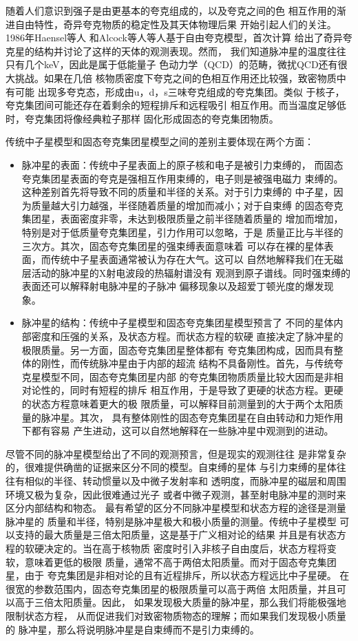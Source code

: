 随着人们意识到强子是由更基本的夸克组成的，以及夸克之间的色
相互作用的渐进自由特性，奇异夸克物质的稳定性及其天体物理后果
开始引起人们的关注\supercite{wit84}。1986年Haensel等人\supercite{hzs86}
和Alcock等人\supercite{afo86}等人基于自由夸克模型，首次计算
给出了奇异夸克星的结构并讨论了这样的天体的观测表现。然而，
我们知道脉冲星的温度往往只有几个keV，因此是属于低能量子
色动力学（QCD）的范畴，微扰QCD还有很大挑战。如果在几倍
核物质密度下夸克之间的色相互作用还比较强，致密物质中有可能
出现多夸克态，形成由u，d，s三味夸克组成的夸克集团。类似
于核子，夸克集团间可能还存在着剩余的短程排斥和远程吸引
相互作用。而当温度足够低时，夸克集团将像经典粒子那样
固化形成固态的夸克集团物质。

传统中子星模型和固态夸克集团星模型之间的差别主要体现在两个方面：
\begin{itemize}
\item 脉冲星的表面：传统中子星表面上的原子核和电子是被引力束缚的，
而固态夸克集团星表面的夸克是强相互作用束缚的，电子则是被强电磁力
束缚的。这种差别首先将导致不同的质量和半径的关系。对于引力束缚的
中子星，因为质量越大引力越强，半径随着质量的增加而减小；对于自束缚
的固态夸克集团星，表面密度非零，未达到极限质量之前半径随着质量的
增加而增加，特别是对于低质量夸克集团星，引力作用可以忽略，于是
质量正比与半径的三次方。其次，固态夸克集团星的强束缚表面意味着
可以存在裸的星体表面，而传统中子星表面通常被认为存在大气。这可以
自然地解释我们在无磁层活动的脉冲星的X射电波段的热辐射谱没有
观测到原子谱线。同时强束缚的表面还可以解释射电脉冲星的子脉冲
偏移现象以及超爱丁顿光度的爆发现象。
\item 脉冲星的结构：传统中子星模型和固态夸克集团星模型预言了
不同的星体内部密度和压强的关系，及状态方程。而状态方程的软硬
直接决定了脉冲星的极限质量。另一方面，固态夸克集团星整体都有
夸克集团构成，因而具有整体的刚性，而传统脉冲星由于内部的超流
结构不具备刚性。首先，与传统夸克星模型不同，固态夸克集团星内部
的夸克集团物质质量比较大因而是非相对论性的，同时有短程的排斥
相互作用，于是导致了更硬的状态方程。更硬的状态方程意味着更大的极
限质量，可以解释目前测量到的大于两个太阳质量的脉冲星。其次，
具有整体刚性的固态夸克集团星在自由转动和力矩作用下都有容易
产生进动，这可以自然地解释在一些脉冲星中观测到的进动。
\end{itemize}

尽管不同的脉冲星模型给出了不同的观测预言，但是现实的观测往往
是非常复杂的，很难提供确凿的证据来区分不同的模型。自束缚的星体
与引力束缚的星体往往有相似的半径、转动惯量以及中微子发射率和
透明度，而脉冲星的磁层和周围环境又极为复杂，因此很难通过光子
或者中微子观测，甚至射电脉冲星的测时来区分内部结构和物态。
最有希望的区分不同脉冲星模型和状态方程的途径是测量脉冲星的
质量和半径，特别是脉冲星极大和极小质量的测量。传统中子星模型
可以支持的最大质量是三倍太阳质量，这是基于广义相对论的结果
并且是有状态方程的软硬决定的\supercite{rr74}。当在高于核物质
密度时引入非核子自由度后，状态方程将变软，意味着更低的极限
质量，通常不高于两倍太阳质量。而对于固态夸克集团星，由于
夸克集团是非相对论的且有近程排斥，所以状态方程远比中子星硬。
在很宽的参数范围内，固态夸克集团星的极限质量可以高于两倍
太阳质量，并且可以高于三倍太阳质量\supercite{lgx13}。因此，
如果发现极大质量的脉冲星，那么我们将能极强地限制状态方程，
从而促进我们对致密物质物态的理解；而如果我们发现极小质量的
脉冲星，那么将说明脉冲星是自束缚而不是引力束缚的。

